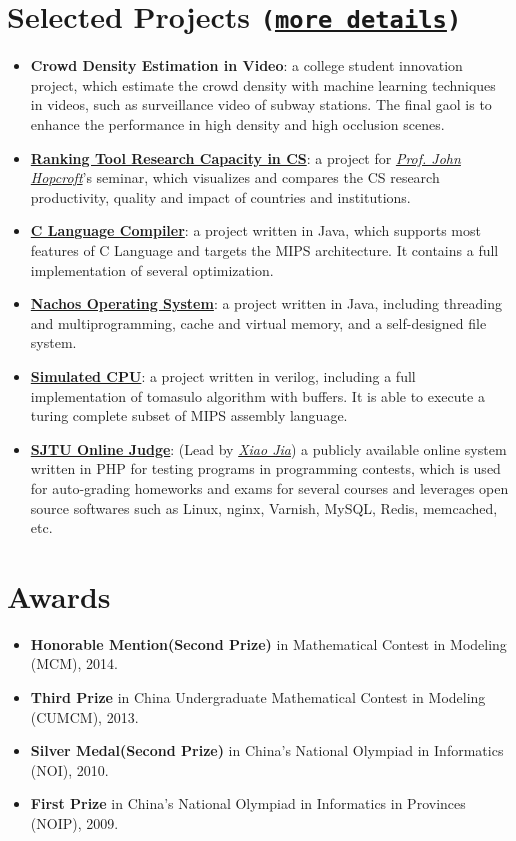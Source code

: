 \documentclass[letterpaper]{article}
\begin{document}
\section*{Selected Projects \normalsize{\tt(\href{https://github.com/lostleaf?tab=repositories}{more details})}}
\begin{itemize}
\item \textbf{Crowd Density Estimation in Video}:
a college student innovation project, which estimate the crowd density with machine learning techniques in videos, such as surveillance video of subway stations. The final gaol is to enhance the performance in high density and high occlusion scenes.
\item \textbf{\href{http://acm.sjtu.edu.cn/ricsrt/}{Ranking Tool Research Capacity in CS}}:
a project for \emph{\href{http://www.cs.cornell.edu/jeh/}{Prof. John Hopcroft}}'s seminar, which visualizes and compares the CS research productivity, quality and impact of countries and institutions.
\item \textbf{\href{https://github.com/lostleaf/compiler}{C Language Compiler}}:
a project written in Java, which supports most features of C Language and targets the MIPS architecture. It contains a full implementation of several optimization.
\item \textbf{\href{https://github.com/lostleaf/nachos}{Nachos Operating System}}: 
a project written in Java, including threading and multiprogramming, cache and virtual memory, and a self-designed file system.
\item \textbf{\href{https://github.com/lostleaf/cpu}{Simulated CPU}}:
a project written in verilog, including a full implementation of tomasulo algorithm with buffers. It is able to execute a turing complete subset of MIPS assembly language.
\item \textbf{\href{http://acm.sjtu.edu.cn/OnlineJudge/}{SJTU Online Judge}}: (Lead by \emph{\href{http://xiao-jia.com/}{Xiao Jia}}) a publicly available online system written in PHP for testing programs in programming contests, which is used for auto-grading homeworks and exams for several courses and leverages open source softwares such as Linux, nginx, Varnish, MySQL, Redis, memcached, etc.
\end{itemize}

\section*{Awards}
\begin{itemize}
\item  \textbf{Honorable Mention(Second Prize)} in Mathematical Contest in Modeling (MCM), 2014.
\item  \textbf{Third Prize} in China Undergraduate Mathematical Contest in Modeling (CUMCM), 2013. 
\item  \textbf{Silver Medal(Second Prize)} in China's National Olympiad in Informatics (NOI), 2010. 
\item  \textbf{First Prize} in China's National Olympiad in Informatics in Provinces (NOIP), 2009. 
\end{itemize}
\end{document}
